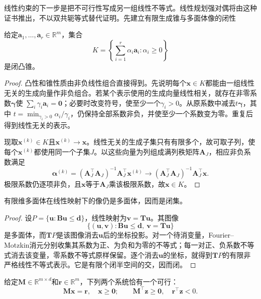 线性约束的下一步是把不可行性写成另一组线性不等式。线性规划强对偶将由这种证书推出，不以双共轭等式替代证明。先建立有限生成锥与多面体像的闭性

\begin{lemma}[有限生成锥的闭性]
\label{lem:opt-finitely-generated-cone}
给定$\bm a_1,\ldots,\bm a_r\in\mathbb R^m$，集合
\[
 K=\left\{\sum_{i=1}^r\alpha_i\bm a_i:\alpha_i\geq0\right\}
\]
是闭凸锥。
\end{lemma}

\begin{proof}
凸性和锥性质由非负线性组合直接得到。先说明每个$\bm x\in K$都能由一组线性无关的生成向量作非负组合。若某个表示使用的生成向量线性相关，就存在非零系数$\bm\gamma$使
$\sum_i\gamma_i\bm a_i=\bm0$；必要时改变符号，使至少一个$\gamma_i>0$。从原系数中减去$t\bm\gamma$，其中
$t=\min_{\gamma_i>0}\alpha_i/\gamma_i$，仍保持全部系数非负，并使至少一个系数变为零。重复后得到线性无关的表示。

现取$\bm x^{(k)}\in K$且$\bm x^{(k)}\to\bm x$。线性无关的生成子集只有有限多个，故可取子列，使每个$\bm x^{(k)}$都使用同一个子集$J$。以这些向量为列组成满列秩矩阵$\bm A_J$，相应非负系数满足
\[
 \bm\alpha^{(k)}=(\bm A_J^\top\bm A_J)^{-1}\bm A_J^\top\bm x^{(k)}
 \longrightarrow
 (\bm A_J^\top\bm A_J)^{-1}\bm A_J^\top\bm x.
\]
极限系数仍逐项非负，且$\bm x$等于$\bm A_J$乘该极限系数，故$\bm x\in K$。
\end{proof}

\begin{lemma}[有限维多面体的线性像]
\label{lem:opt-polyhedral-image}
有限维多面体在线性映射下的像仍是多面体，因而是闭集。
\end{lemma}

\begin{proof}
设$P=\{\bm u:\bm B\bm u\leq\bm d\}$，线性映射为$\bm v=\bm T\bm u$。其图像
\[
 \{(\bm u,\bm v):\bm B\bm u\leq\bm d,\ \bm v=\bm T\bm u\}
\]
是多面体，而$\bm T P$是该图像消去$\bm u$后的坐标投影。对一个待消变量，Fourier--Motzkin消元分别收集其系数为正、为负和为零的不等式；每一对正、负系数不等式消去该变量，零系数不等式原样保留。逐个消去$\bm u$的坐标，就得到$\bm T P$的有限非严格线性不等式表示。它是有限个闭半空间的交，因而闭。
\end{proof}

\begin{theorem}[Farkas择一定理]
\label{thm:opt-farkas}
给定$\bm M\in\mathbb R^{m\times d}$和$\bm r\in\mathbb R^m$，下列两个系统恰有一个可行：
\[
 \bm M\bm x=\bm r,\quad\bm x\geq\bm0;
 \qquad
 \bm M^\top\bm z\geq\bm0,\quad\bm r^\top\bm z<0.
\]
\end{theorem}

